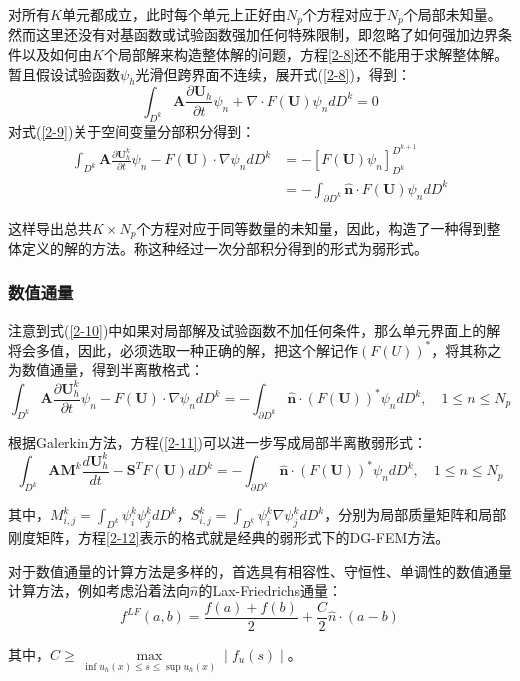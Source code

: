 \documentclass[12pt]{article}
\begin{document}
对所有$K$单元都成立，此时每个单元上正好由$N_p$个方程对应于$N_p$个局部未知量。然而这里还没有对基函数或试验函数强加任何特殊限制，即忽略了如何强加边界条件以及如何由$K$个局部解来构造整体解的问题，方程\ref{2-8}还不能用于求解整体解。暂且假设试验函数$\psi_h$光滑但跨界面不连续，展开式(\ref{2-8})，得到：
\begin{equation}\label{2-9}
\int_{D^k}\boldsymbol{A}\frac{\partial \boldsymbol{U}_h}{\partial t}\psi_n+\nabla \cdot F(\boldsymbol{U})\psi_n dD^k=0
\end{equation}
对式(\ref{2-9})关于空间变量分部积分得到：
\begin{equation}\label{2-10}
\begin{split}
\int_{D^k}\boldsymbol{A}\frac{\partial \boldsymbol{U}_h^k}{\partial t}\psi_n-F(\boldsymbol{U}) \cdot \nabla \psi_n dD^k & = -[F(\boldsymbol{U}) \psi_n]_{D^k}^{D ^{k+1}}\\
& = -\int_{\partial D^k}\hat{\boldsymbol{n}} \cdot F(\boldsymbol{U}) \psi_n dD^k
\end{split}
\end{equation}
\par
这样导出总共$K \times N_p$个方程对应于同等数量的未知量，因此，构造了一种得到整体定义的解的方法。称这种经过一次分部积分得到的形式为弱形式。
\subsubsection{数值通量}
注意到式(\ref{2-10})中如果对局部解及试验函数不加任何条件，那么单元界面上的解将会多值，因此，必须选取一种正确的解，把这个解记作$(F(U))^*$，将其称之为数值通量，得到半离散格式：
\begin{equation}\label{2-11}
\int_{D^k}\boldsymbol{A}\frac{\partial \boldsymbol{U}_h^k}{\partial t}\psi_n-F(\boldsymbol{U}) \cdot \nabla \psi_n dD^k=-\int_{\partial D^k}\hat{\boldsymbol{n}} \cdot (F(\boldsymbol{U}) )^*\psi_n dD^k,\quad 1 \le n \le N_p
\end{equation}
\par
根据Galerkin方法，方程(\ref{2-11})可以进一步写成局部半离散弱形式：
\begin{equation}\label{2-12}
\int_{D^k}\boldsymbol{A}\boldsymbol{M}^k \frac{d\boldsymbol{U}_h^k}{dt}-\boldsymbol{S}^T F(\boldsymbol{U}) dD^k=-\int_{\partial D^k}\hat{\boldsymbol{n}} \cdot (F(\boldsymbol{U}) )^*\psi_n dD^k,\quad 1 \le n \le N_p
\end{equation}
\par
其中，$M_{i,j}^k=\int_{D^k}\psi_i^k \psi_j^k dD^k$，$S_{i,j}^k=\int_{D^k}\psi_i^k \nabla \psi_j^k dD^k$，分别为局部质量矩阵和局部刚度矩阵，方程\ref{2-12}表示的格式就是经典的弱形式下的DG-FEM方法。
\par
对于数值通量的计算方法是多样的，首选具有相容性、守恒性、单调性的数值通量计算方法，例如考虑沿着法向$\hat{n}$的Lax-Friedrichs通量：
\begin{equation}\label{2-13}
f^{LF}(a,b)=\frac{f(a)+f(b)}{2}+\frac{C}{2}\hat{n} \cdot (a-b)
\end{equation}
\par
其中，$C\ge \max\limits_{\inf u_h(x)\le s \le \sup u_h(x)}\mid f_u(s) \mid$。
\end{document}
